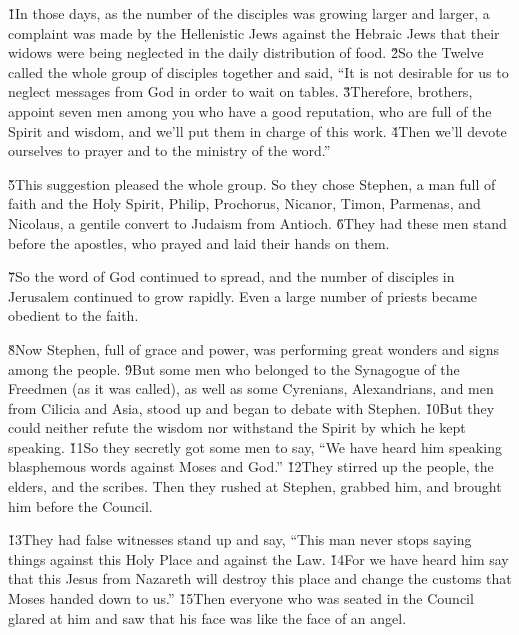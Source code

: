 \v{1}In those days, as the number of the disciples was growing larger and larger, a complaint was made by the Hellenistic Jews against the Hebraic Jews that their widows were being neglected in the daily distribution of food. \v{2}So the Twelve called the whole group of disciples together and said, ``It is not desirable for us to neglect messages from God in order to wait on tables. \v{3}Therefore, brothers, appoint seven men among you who have a good reputation, who are full of the Spirit and wisdom, and we'll put them in charge of this work. \v{4}Then we'll devote ourselves to prayer and to the ministry of the word.''

\v{5}This suggestion pleased the whole group. So they chose Stephen, a man full of faith and the Holy Spirit, Philip, Prochorus, Nicanor, Timon, Parmenas, and Nicolaus, a gentile convert to Judaism from Antioch. \v{6}They had these men stand before the apostles, who prayed and laid their hands on them.

\v{7}So the word of God continued to spread, and the number of disciples in Jerusalem continued to grow rapidly. Even a large number of priests became obedient to the faith.

\v{8}Now Stephen, full of grace and power, was performing great wonders and signs among the people. \v{9}But some men who belonged to the Synagogue of the Freedmen (as it was called), as well as some Cyrenians, Alexandrians, and men from Cilicia and Asia, stood up and began to debate with Stephen. \v{10}But they could neither refute the wisdom nor withstand the Spirit by which he kept speaking. \v{11}So they secretly got some men to say, ``We have heard him speaking blasphemous words against Moses and God.'' \v{12}They stirred up the people, the elders, and the scribes. Then they rushed at Stephen, grabbed him, and brought him before the Council.

\v{13}They had false witnesses stand up and say, ``This man never stops saying things against this Holy Place and against the Law. \v{14}For we have heard him say that this Jesus from Nazareth will destroy this place and change the customs that Moses handed down to us.'' \v{15}Then everyone who was seated in the Council glared at him and saw that his face was like the face of an angel.

